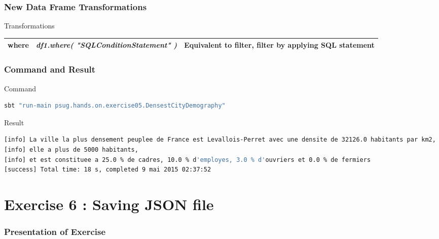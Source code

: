 \documentclass[slidetop,9pt,utf8]{beamer}
\begin{document}
\begin{CJK}{UTF8}{gbsn}
\begin{frame}

  \frametitle{New Data Frame Transformations}

  \begin{block}{Transformations}
    \begin{center}
      \begin{tabular}{|m{2.1cm}|m{3.5cm}|m{5cm}|}
        \hline 
        \textbf{where} & \textit{df1.where( \newline  "SQLConditionStatement" \newline )} & Equivalent to filter, filter by applying SQL statement \\ \hline
      \end{tabular}
    \end{center}
  \end{block}

\end{frame}

\begin{frame}[fragile]
  \frametitle{Command and Result}

  \begin{block}{Command}
    \begin{lstlisting}[language=bash, style=terminal]
sbt "run-main psug.hands.on.exercise05.DensestCityDemography"
    \end{lstlisting}
  \end{block}

  \begin{block}{Result}
    \begin{lstlisting}[language=bash, style=terminal]
[info] La ville la plus densement peuplee de France est Levallois-Perret avec une densite de 32126.0 habitants par km2, 
[info] elle a plus de 5000 habitants, 
[info] et est constituee a 25.0 % de cadres, 10.0 % d'employes, 3.0 % d'ouvriers et 0.0 % de fermiers
[success] Total time: 18 s, completed 9 mai 2015 02:37:52
    \end{lstlisting}
  \end{block}

\end{frame}


\section{Exercise 6 : Saving JSON file}

\begin{frame}
  \frametitle{Presentation of Exercise}


\end{frame}
\end{CJK}
\end{document}
